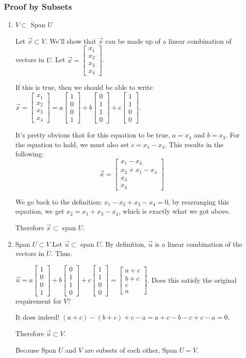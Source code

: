 \documentclass[letter]{article}
\newcommand{\mat}[1]{\begin{bmatrix}#1\end{bmatrix}}
\begin{document}
\subsubsection{Proof by Subsets}
\begin{enumerate}

\item $V \subset $ Span $U$

Let $\vec x \subset V$. We'll show that $\vec x$ can be made up of a linear combination of vectors in $U$. Let $\vec x = \mat{x_1\\x_2\\x_3\\x_4}$.

If this is true, then we should be able to write
$\vec x = \mat{x_1\\x_2\\x_3\\x_4} = a \mat{1\\0\\0\\1} + b\mat{0\\1\\1\\0} + c\mat{1\\1\\0\\0}$.

It's pretty obvious that for this equation to be true, $a = x_4$ and $b = x_3$. For the equation to hold, we must also set $c = x_1-x_4$. This results in the following:
\[
\vec x = \mat{x_1-x_4\\x_3+x_1-x_4\\x_3\\x_4}
\]

We go back to the definition: $x_1-x_2+x_3-x_4 = 0$, by rearranging this equation, we get $x_2 = x_1+x_3-x_4$, which is exactly what we got above.

Therefore $\vec x \subset$ span $U$.

\item Span $U \subset V$
Let $\vec u \subset $ span $U$. By definition, $\vec u$ is a linear combination of the vectors in $U$. Thus.

$\vec u = a \mat{1\\0\\0\\1} + b\mat{0\\1\\1\\0} + c\mat{1\\1\\0\\0} = \mat{a+c\\b+c\\c\\a}$. Does this satisfy the original requirement for $V$?

It does indeed! $(a+c)-(b+c)+c-a = a+c-b-c+c-a = 0$.

Therefore $\vec u \subset V$.

Because Span $U$ and $V$ are subsets of each other, Span $U=V$.
\end{enumerate}
\end{document}
